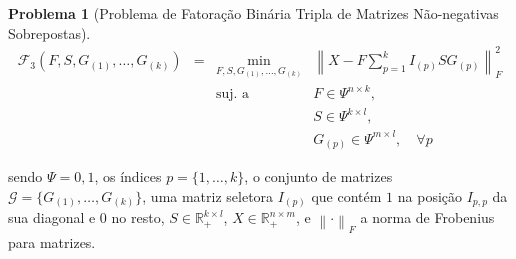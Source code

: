 \documentclass[
    12pt,                %
    oneside,            %
    a4paper,            %
    english,            %
    brazil                %
    ]{abntex2ppgsi}
\newtheorem{problem}{Problema}
\newcommand{\norm}[1]{\left\lVert#1\right\rVert}
\begin{document}
\begin{problem}[Problema de Fatoração Binária Tripla de Matrizes Não-negativas Sobrepostas]
\label{def:ovnmtf:problem}
\begin{equation}
    \begin{array}{lclc}
        \displaystyle \mathcal{F}_3(F, S, G_{(1)}, \dots, G_{(k)}) & = & \displaystyle \min_{F, S, G_{(1)}, \dots, G_{(k)}} & \norm{ X - F \sum_{p=1}^{k} I_{(p)} S G_{(p)} }^{2}_{F} \\
                                                                   &   & \text{suj. a}                & F \in \Psi^{n \times k}, \\
                                                                   &   &                              & S \in \Psi^{k \times l}, \\
                                                                   &   &                              & G_{(p)} \in \Psi^{m \times l}, \quad \forall p
    \end{array}
\end{equation}
\end{problem}

sendo $\Psi = {0, 1}$, os índices $p = \{1, \dots, k\}$, o conjunto de matrizes $\mathcal{G} = \{ G_{(1)}, \dots, G_{(k)} \}$, uma matriz seletora $I_{(p)}$ que contém $1$ na posição $I_{p,p}$ da sua diagonal e $0$ no resto, $S \in \mathbb{R}^{k \times l}_{+}$, $X \in \mathbb{R}^{n \times m}_{+}$, e $\norm{\cdot}_F$ a norma de Frobenius para matrizes.





\end{document}
